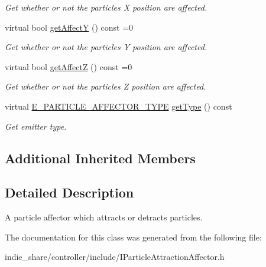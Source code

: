 \begin{DoxyCompactItemize}
\begin{DoxyCompactList}\small\item\em Get whether or not the particles X position are affected. \end{DoxyCompactList}\item 
\mbox{\label{classirr_1_1scene_1_1IParticleAttractionAffector_a06a2872adddd7bfca9f79325563dd799}} 
virtual bool \hyperlink{classirr_1_1scene_1_1IParticleAttractionAffector_a06a2872adddd7bfca9f79325563dd799}{get\+AffectY} () const =0
\begin{DoxyCompactList}\small\item\em Get whether or not the particles Y position are affected. \end{DoxyCompactList}\item 
\mbox{\label{classirr_1_1scene_1_1IParticleAttractionAffector_a71c62c5cd7e871eef76fca9a686e15fc}} 
virtual bool \hyperlink{classirr_1_1scene_1_1IParticleAttractionAffector_a71c62c5cd7e871eef76fca9a686e15fc}{get\+AffectZ} () const =0
\begin{DoxyCompactList}\small\item\em Get whether or not the particles Z position are affected. \end{DoxyCompactList}\item 
\mbox{\label{classirr_1_1scene_1_1IParticleAttractionAffector_a3040cb5bc4ec7eef2472be5d7d787e46}} 
virtual \hyperlink{namespaceirr_1_1scene_a34c0f9475cfcbda8b50ad816a046010b}{E\+\_\+\+P\+A\+R\+T\+I\+C\+L\+E\+\_\+\+A\+F\+F\+E\+C\+T\+O\+R\+\_\+\+T\+Y\+PE} \hyperlink{classirr_1_1scene_1_1IParticleAttractionAffector_a3040cb5bc4ec7eef2472be5d7d787e46}{get\+Type} () const
\begin{DoxyCompactList}\small\item\em Get emitter type. \end{DoxyCompactList}\end{DoxyCompactItemize}
\subsection*{Additional Inherited Members}


\subsection{Detailed Description}
A particle affector which attracts or detracts particles. 

The documentation for this class was generated from the following file\+:\begin{DoxyCompactItemize}
\item 
indie\+\_\+share/controller/include/I\+Particle\+Attraction\+Affector.\+h\end{DoxyCompactItemize}
